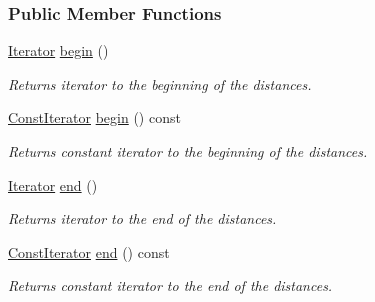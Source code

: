 \subsubsection*{Public Member Functions}
\begin{DoxyCompactItemize}
\item 
\hyperlink{structslb_1_1ext_1_1heuristic_1_1differential_1_1DistanceMap_3_01State_00_01Index_00_01IndexKind_1_1none_01_4_ab5a07fc5da2680acfe08b598844a065d}{Iterator} \hyperlink{structslb_1_1ext_1_1heuristic_1_1differential_1_1DistanceMap_3_01State_00_01Index_00_01IndexKind_1_1none_01_4_a2eea88fd944da897af2b747930e1e759}{begin} ()
\begin{DoxyCompactList}\small\item\em Returns iterator to the beginning of the distances. \end{DoxyCompactList}\item 
\hyperlink{structslb_1_1ext_1_1heuristic_1_1differential_1_1DistanceMap_3_01State_00_01Index_00_01IndexKind_1_1none_01_4_a3a019e07ed97eaea1e42ffc7d39e03d7}{Const\+Iterator} \hyperlink{structslb_1_1ext_1_1heuristic_1_1differential_1_1DistanceMap_3_01State_00_01Index_00_01IndexKind_1_1none_01_4_a12ff1931fdbb60942309f0e04fdbe462}{begin} () const 
\begin{DoxyCompactList}\small\item\em Returns constant iterator to the beginning of the distances. \end{DoxyCompactList}\item 
\hyperlink{structslb_1_1ext_1_1heuristic_1_1differential_1_1DistanceMap_3_01State_00_01Index_00_01IndexKind_1_1none_01_4_ab5a07fc5da2680acfe08b598844a065d}{Iterator} \hyperlink{structslb_1_1ext_1_1heuristic_1_1differential_1_1DistanceMap_3_01State_00_01Index_00_01IndexKind_1_1none_01_4_a2fe7b4835665ee22009b5afdbc6de266}{end} ()
\begin{DoxyCompactList}\small\item\em Returns iterator to the end of the distances. \end{DoxyCompactList}\item 
\hyperlink{structslb_1_1ext_1_1heuristic_1_1differential_1_1DistanceMap_3_01State_00_01Index_00_01IndexKind_1_1none_01_4_a3a019e07ed97eaea1e42ffc7d39e03d7}{Const\+Iterator} \hyperlink{structslb_1_1ext_1_1heuristic_1_1differential_1_1DistanceMap_3_01State_00_01Index_00_01IndexKind_1_1none_01_4_a50c049933b5b704b413c0dc7f011c30c}{end} () const 
\begin{DoxyCompactList}\small\item\em Returns constant iterator to the end of the distances. \end{DoxyCompactList}\item 

\end{DoxyCompactItemize}
